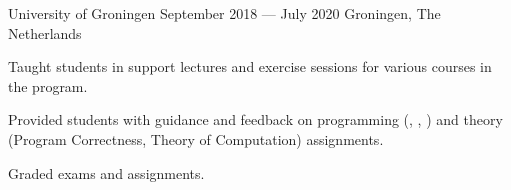 \begin{cventries}
	{University of Groningen}
	{September 2018 --- July 2020} %
	{Groningen, The Netherlands}
	{%
		\begin{cvitems}
		\item Taught students in support lectures and exercise sessions for various courses in the program.
		\item Provided students with guidance and feedback on programming (, , ) and theory\\ (Program Correctness, Theory of Computation) assignments.
		\item Graded exams and assignments.
		\end{cvitems}
	}

\end{cventries}
